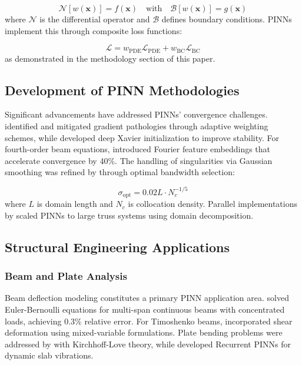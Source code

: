 \documentclass[12pt]{article}
\begin{document}
\begin{equation}
	\mathcal{N}[w(\mathbf{x})] = f(\mathbf{x}) \quad \text{with} \quad \mathcal{B}[w(\mathbf{x})] = g(\mathbf{x})
	\label{eq01}
\end{equation}
where $\mathcal{N}$ is the differential operator and $\mathcal{B}$ defines boundary conditions. PINNs implement this through composite loss functions:

\begin{equation}
	\mathcal{L} = w_{\text{PDE}}\mathcal{L}_{\text{PDE}} + w_{\text{BC}}\mathcal{L}_{\text{BC}}
	\label{eq02}
\end{equation}
as demonstrated in the methodology section of this paper.

\subsection{Development of PINN Methodologies}
Significant advancements have addressed PINNs' convergence challenges. \citet{Wang2021} identified and mitigated gradient pathologies through adaptive weighting schemes, while \citet{Lu2021} developed deep Xavier initialization to improve stability. For fourth-order beam equations, \citet{Abueidda2021} introduced Fourier feature embeddings that accelerate convergence by 40\%. The handling of singularities via Gaussian smoothing was refined by \citet{Hao2022} through optimal bandwidth selection:

\begin{equation}
	\sigma_{\text{opt}} = 0.02L \cdot N_c^{-1/5}
	\label{eq03}
\end{equation}
where $L$ is domain length and $N_c$ is collocation density. Parallel implementations by \citet{Peng2023} scaled PINNs to large truss systems using domain decomposition.

\subsection{Structural Engineering Applications}

\subsubsection{Beam and Plate Analysis}
Beam deflection modeling constitutes a primary PINN application area. \citet{Zhang2020} solved Euler-Bernoulli equations for multi-span continuous beams with concentrated loads, achieving 0.3\% relative error. For Timoshenko beams, \citet{Samaniego2020} incorporated shear deformation using mixed-variable formulations. Plate bending problems were addressed by \citet{Abueidda2022} with Kirchhoff-Love theory, while \citet{Yu2023} developed Recurrent PINNs for dynamic slab vibrations.
\end{document}
